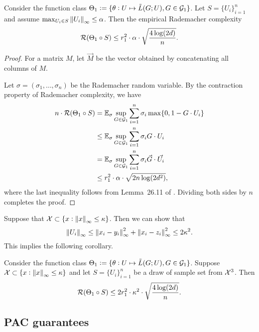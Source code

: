 \begin{lemma}\label{lem:Rad-l1}
Consider the function class $\Theta_1 := \{ \theta: U \mapsto \tilde{L}(G; U), G \in \mathcal{G}_1 \}$. Let $S = \{U_i\}_{i=1}^n$ and assume $\max_{U_i \in S} \left\lVert U_i \right\rVert_{\infty} \leq \alpha$. Then the empirical Rademacher complexity 
\begin{equation*}
\mathcal{R}(\Theta_1 \circ S) \leq r^2_1 \cdot \alpha \cdot \sqrt{\frac{4\log (2d)}{n}}.
\end{equation*}
\end{lemma}
\begin{proof}
For a matrix $M$, let $\vec{M}$ be the vector obtained by concatenating all columns of $M$.

Let $\sigma = (\sigma_1, \dots, \sigma_n)$ be the Rademacher random variable. By the contraction property of Rademacher complexity, we have
\begin{align*}
n \cdot  \mathcal{R}(\Theta_1 \circ S) &= \mathbb{E}_{\sigma} \sup_{G \in \mathcal{G}_1} \sum_{i=1}^{n} \sigma_i \max\{0, 1 - G \cdot U_i\}\\
&\leq \mathbb{E}_{\sigma} \sup_{G \in \mathcal{G}_1} \sum_{i=1}^{n} \sigma_i  G \cdot U_i\\
&= \mathbb{E}_{\sigma} \sup_{G \in \mathcal{G}_1} \sum_{i=1}^{n} \sigma_i  \vec{G} \cdot \vec{U_i}\\
&\leq r_1^2 \cdot \alpha \cdot \sqrt{2n \log(2d^2)},
\end{align*}
where the last inequality follows from Lemma~26.11 of \citet{shalev2014understanding}. Dividing both sides by $n$ completes the proof.
\end{proof}

Suppose that $\mathcal{X} \subset \{x: \left\lVert x \right\rVert_{\infty} \leq \kappa\}$. Then we can show that
\begin{equation*}
\left\lVert U_i \right\rVert_{\infty} \leq \left\lVert x_i - y_i \right\rVert_{\infty}^2 + \left\lVert x_i - z_i \right\rVert_{\infty}^2 \leq 2 \kappa^2.
\end{equation*}
This implies the following corollary.
\begin{corollary}\label{cor:l1}
Consider the function class $\Theta_1 := \{ \theta: U \mapsto \tilde{L}(G; U), G \in \mathcal{G}_1 \}$. Suppose $\mathcal{X} \subset \{x: \left\lVert x \right\rVert_{\infty} \leq \kappa\}$ and let $S = \{U_i\}_{i=1}^n$ be a draw of sample set from $\mathcal{X}^3$. Then
\begin{equation*}
\mathcal{R}(\Theta_1 \circ S) \leq 2 r^2_1 \cdot \kappa^2 \cdot \sqrt{\frac{4\log (2d)}{n}}.
\end{equation*}
\end{corollary}

\subsection{PAC guarantees}


